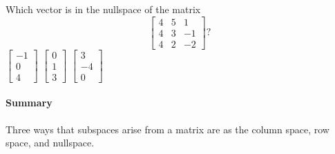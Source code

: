 \begin{activity}
Which vector is in the nullspace of the matrix
\begin{equation*}
\begin{bmatrix} 4&5&1
\\4&3&-1
\\4&2&-2 \end{bmatrix}?
\end{equation*}
{\(\begin{bmatrix} -1\\0\\4 \end{bmatrix}\)}
{\(\begin{bmatrix} 0\\1\\3 \end{bmatrix}\)}
{\(\begin{bmatrix} 3\\-4\\0 \end{bmatrix}\)}
\end{activity}
   


\paragraph{Summary} Three ways that subspaces arise from a matrix are as the column space, row space, and nullspace.


